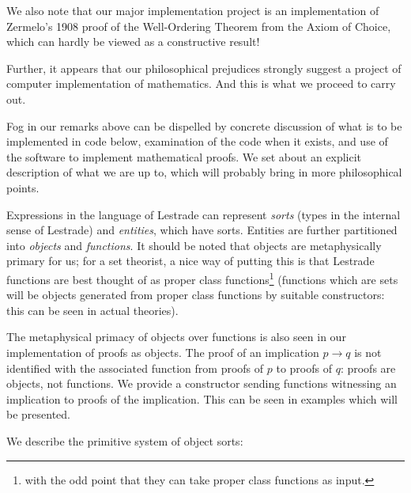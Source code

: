 \documentclass[12pt]{article}
\begin{document}
We also note that our major implementation project is an implementation of Zermelo's 1908 proof of the Well-Ordering Theorem from the Axiom of Choice, which can hardly be viewed as a constructive result!

Further, it appears that our philosophical prejudices strongly suggest a project of computer implementation of mathematics.  And this is what we proceed to carry out.

Fog in our remarks above can be dispelled by concrete discussion of what is to be implemented in code below, examination of the code when it exists, and use of the software to implement
mathematical proofs.  We set about an explicit description of what we are up to, which will probably bring in more philosophical points.

Expressions in the language of Lestrade can represent {\em sorts} (types in the internal sense of Lestrade) and {\em entities\/}, which have sorts.  Entities are further partitioned
into {\em objects\/} and {\em functions\/}.  It should be noted that objects are metaphysically primary for us;  for a set theorist, a nice way of putting this is that Lestrade functions
are best thought of as proper class functions\footnote{with the odd point that they can take proper class functions as input.}  (functions which are sets will be objects generated from proper class functions by suitable constructors:  this can be seen in actual theories).

The metaphysical primacy of objects over functions is also seen in our implementation of proofs as objects.  The proof of an implication $p \rightarrow q$ is not identified with
the associated function from proofs of $p$ to proofs of $q$:  proofs are objects, not functions.  We provide a constructor sending functions witnessing an implication to proofs of the implication.  This can be seen in examples which will be presented.

We describe the primitive system of object sorts:
\end{document}
